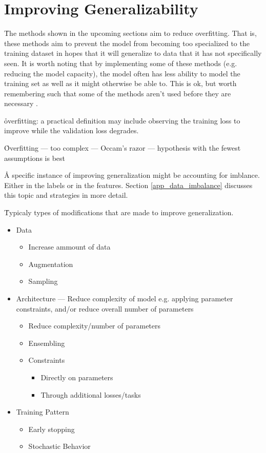 \chapter{Improving Generalizability}

\r{The methods shown in the upcoming sections aim to reduce overfitting. That is, these methods aim to prevent the model from becoming too specialized to the training dataset in hopes that it will generalize to data that it has not specifically seen. It is worth noting that by implementing some of these methods (e.g. reducing the model capacity), the model often has less ability to model the training set as well as it might otherwise be able to. This is ok, but worth remembering such that some of the methods aren't used before they are necessary .}

\r{overfitting: a practical definition may include observing the training loss to improve while the validation loss degrades. }

\r{Overfitting --- too complex --- Occam's razor --- hypothesis with the fewest assumptions is best}

\r{A specific instance of improving generalization might be accounting for imblance. Either in the labels or in the features.  Section \ref{app_data_imbalance} discusses this topic and strategies in more detail.}

\r{Typicaly types of modifications that are made to improve generalization.}

\begin{itemize}[noitemsep,topsep=0pt]
	\item Data
	\begin{itemize}[noitemsep,topsep=0pt]
		\item Increase ammount of data
		\item Augmentation
		\item Sampling
	\end{itemize}
	\item Architecture --- Reduce complexity of model e.g. applying parameter constraints, and/or reduce overall number of parameters
	\begin{itemize}[noitemsep,topsep=0pt]
		\item Reduce complexity/number of parameters
		\item Ensembling
		\item Constraints
		\begin{itemize}[noitemsep,topsep=0pt]
			\item Directly on parameters
			\item Through additional losses/tasks
		\end{itemize}
	\end{itemize}
	\item Training Pattern
	\begin{itemize}[noitemsep,topsep=0pt]
		\item Early stopping
		\item Stochastic Behavior
	\end{itemize}
\end{itemize}


